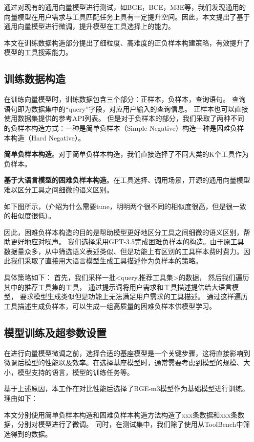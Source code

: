 通过对现有的通用向量模型进行测试，如BGE，BCE，M3E等，我们发现通用的向量模型在用户需求与工具匹配任务上具有一定提升空间。因此，本文提出了基于通用向量模型进行微调，提升模型在工具选择上的能力。

本文在训练数据构造部分提出了细粒度、高难度的正负样本构建策略，有效提升了模型的工具搜索能力。

\subsection{训练数据构造}

在训练向量模型时，训练数据包含三个部分：正样本，负样本，查询语句。
查询语句即为数据集中的“query”字段，对应用户输入的查询信息。
正样本也可以直接使用数据集提供的参考API列表。
但是对于负样本的部分，我们采取了两种不同的负样本构造方式：一种是简单负样本（Simple Negative）构造一种是困难负样本构造（Hard Negative）。

\indent \textbf{简单负样本构造}。对于简单负样本构造，我们直接选择了不同大类的K个工具作为负样本。

\indent \textbf{基于大语言模型的困难负样本构造}。在工具选择、调用场景，开源的通用向量模型难以区分工具之间细微的语义区别。

如下图所示，（介绍为什么需要tune，明明两个很不同的相似度很高，但是很一致的相似度很低）。

因此，困难负样本构造的目的是帮助模型更好地区分工具之间细微的语义区别，帮助更好地应对噪声。
我们选择采用GPT-3.5完成困难负样本的构造。由于原工具数据量众多，从中筛选语义表述类似、但是功能上有区别的工具样本费时费力。因此我们采取了直接用大语言模型生成工具描述作为负样本的策略。

具体策略如下：
首先，我们采样一批<query,推荐工具集>的数据，
然后我们遍历其中的推荐工具集的工具，
通过提示词将用户需求和工具描述提供给大语言模型，
要求模型生成类似但是功能上无法满足用户需求的工具描述。
通过这样遍历工具描述生成负样本，可以生成一组高质量的困难负样本供模型学习。

\subsection{模型训练及超参数设置}

在进行向量模型微调之前，选择合适的基座模型是一个关键步骤，这将直接影响到微调后模型的性能以及效率。在选择基座模型时，通常需要考虑到模型的规模、大小，模型支持的语言，模型的训练任务等。

基于上述原因，本工作在对比性能后选择了BGE-m3模型作为基础模型进行训练。理由如下：

本文分别使用简单负样本构造和困难负样本构造方法构造了xxx条数据和xxx条数据，分别对模型进行了微调。
同时，在测试集中，我们除了使用从ToolBench中筛选得到的数据。

